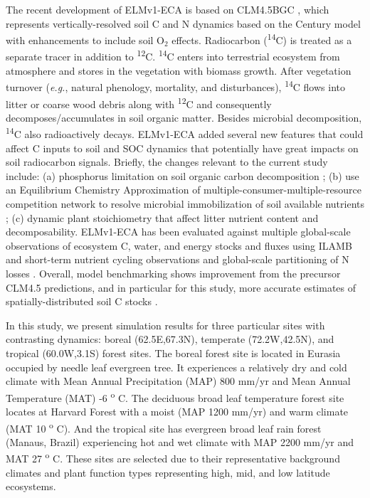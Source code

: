 \documentclass[11pt,a4paper]{article}
\begin{document}
    The recent development of ELMv1-ECA \citep{Zhu2019} is based on CLM4.5BGC \citep{Koven2013}, which represents vertically-resolved soil C and N dynamics based on the Century model \citep{Parton1993} with enhancements  to include soil O$_2$ effects. Radiocarbon (\textsuperscript{14}C) is treated as a separate tracer in addition to \textsuperscript{12}C. \textsuperscript{14}C enters into terrestrial ecosystem from atmosphere and stores in the vegetation with biomass growth. After vegetation turnover (\textit{e.g.}, natural phenology, mortality, and disturbances), \textsuperscript{14}C flows into litter or coarse wood debris  along with \textsuperscript{12}C and consequently decomposes/accumulates in soil organic matter. Besides microbial decomposition, \textsuperscript{14}C also radioactively decays.  ELMv1-ECA added several new features that could affect C inputs to soil and SOC dynamics that potentially have great impacts on soil radiocarbon signals. Briefly, the changes relevant to the current study include: (a) phosphorus limitation on soil organic carbon decomposition \citep{zhu2016bg}; (b) use an Equilibrium Chemistry Approximation of multiple-consumer-multiple-resource competition network to resolve microbial immobilization of soil available nutrients \citep{Tang2013, Zhu2017ea} ; (c) dynamic plant stoichiometry that affect litter nutrient content and decomposability. ELMv1-ECA has been evaluated against multiple global-scale observations of ecosystem C, water, and energy stocks and fluxes using ILAMB \citep{Collier2018, Zhu2019} and short-term nutrient cycling observations and global-scale partitioning of N losses \citep{Zhu2015ncc, Riley2018}. Overall, model benchmarking shows improvement from the precursor CLM4.5 predictions, and in particular for this study, more accurate estimates of spatially-distributed soil C stocks \citep{Zhu2019}.
    
  In this study, we present simulation results for three particular sites with contrasting dynamics: boreal (62.5E,67.3N), temperate  (72.2W,42.5N), and tropical (60.0W,3.1S) forest sites. The boreal forest site is located in Eurasia occupied by needle leaf evergreen tree. It experiences a relatively dry and cold climate with Mean Annual Precipitation (MAP) 800 mm/yr and Mean Annual Temperature (MAT) -6 \textsuperscript{o} C. The deciduous broad leaf temperature forest site locates at Harvard Forest with a moist (MAP 1200 mm/yr) and warm climate (MAT 10 \textsuperscript{o} C). And the tropical site has evergreen broad leaf rain forest (Manaus, Brazil) experiencing hot and wet climate with MAP 2200 mm/yr and MAT 27 \textsuperscript{o} C. These sites are selected due to their representative background climates and plant function types representing high, mid, and low latitude ecosystems.   
    
\end{document}
